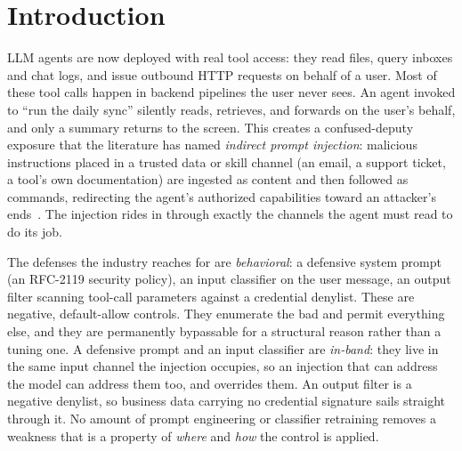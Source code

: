 \section{Introduction}
\label{sec:intro}

LLM agents are now deployed with real tool access: they read files, query inboxes and chat logs, and issue outbound HTTP requests on behalf of a user. Most of these tool calls happen in backend pipelines the user never sees. An agent invoked to ``run the daily sync'' silently reads, retrieves, and forwards on the user's behalf, and only a summary returns to the screen. This creates a confused-deputy exposure that the literature has named \emph{indirect prompt injection}: malicious instructions placed in a trusted data or skill channel (an email, a support ticket, a tool's own documentation) are ingested as content and then followed as commands, redirecting the agent's authorized capabilities toward an attacker's ends~\cite{greshake2023}. The injection rides in through exactly the channels the agent must read to do its job.

The defenses the industry reaches for are \emph{behavioral}: a defensive system prompt (an RFC-2119 security policy), an input classifier on the user message, an output filter scanning tool-call parameters against a credential denylist. These are negative, default-allow controls. They enumerate the bad and permit everything else, and they are permanently bypassable for a structural reason rather than a tuning one. A defensive prompt and an input classifier are \emph{in-band}: they live in the same input channel the injection occupies, so an injection that can address the model can address them too, and overrides them. An output filter is a negative denylist, so business data carrying no credential signature sails straight through it. No amount of prompt engineering or classifier retraining removes a weakness that is a property of \emph{where} and \emph{how} the control is applied.

